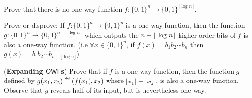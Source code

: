 \documentclass[11pt]{exam}
\newcommand{\bool}{\{0,1\}}
\newcommand{\owf}{\mathsf{OWF}}
\newcommand\myeq{\mathrel{\overset{\makebox[0pt]{\mbox{\normalfont\tiny\sffamily def}}}{=}}}
\begin{document}
\begin{questions}

\question[10] 
Prove that there is no one-way function $f\colon\bool^n\to \bool^{\lfloor \log n \rfloor}$.
\question[10]

Prove or disprove: If $f:\bool^n\to\bool^n$ is a one-way function, then the function $g:\bool^n\to\bool^{n-\lfloor \log n \rfloor}$ which outputs the $n-\lfloor \log n \rfloor$ higher order bits of $f$ is also a one-way function. (i.e $\forall x \in \bool^n$, if $f(x)=b_1b_2\cdots b_n$ then $g(x)=b_1b_2\cdots b_{n-\lfloor \log n \rfloor}$)

\question[10]({\bf Expanding $\owf$s}) Prove that if $f$ is a one-way function, then the function $g$ defined by $g(x_1,x_2)\myeq\left(f(x_1),x_2\right)$ where $|x_1|=|x_2|$, is also a one-way function. Observe that $g$ reveals half of its input, but is nevertheless one-way.
    

\end{questions}
\end{document}
